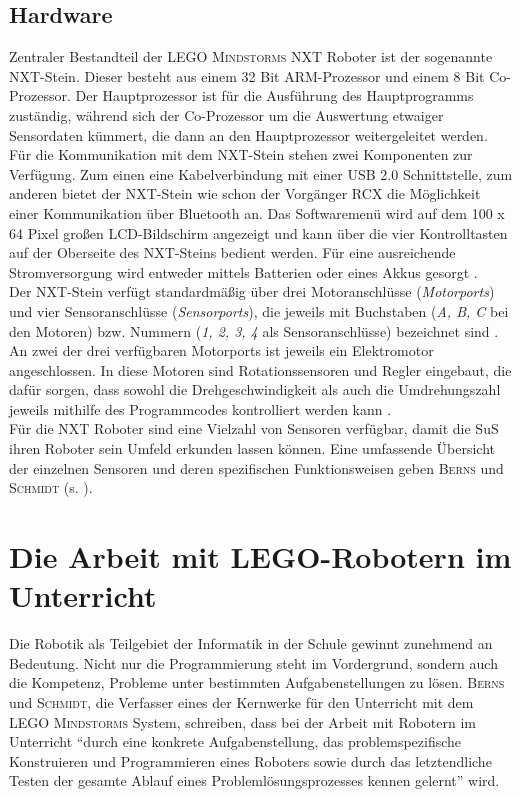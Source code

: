 \documentclass[paper=a4, pagesize, DIV=calc, BCOR=15mm, twoside=on, onecolumn=on, open = right, titlepage =on, parskip =half-, headsepline = on, footsepline = on, chapterprefix = on, appendixprefix = off, fontsize = 12pt, numbers = noenddot, abstract = on]{scrbook}
\numberwithin{equation}{chapter}
\theoremstyle{definition}
\theoremstyle{plain}
\theoremstyle{plain}
\theoremstyle{remark}
\theoremstyle{plain}
\theoremstyle{plain}
\begin{document}
\par \singlespacing
\subsection{Hardware}
\onehalfspacing
Zentraler Bestandteil der \textsc{LEGO Mindstorms} NXT Roboter ist der sogenannte NXT-Stein. Dieser besteht aus einem 32 Bit ARM-Prozessor und einem 8 Bit Co-Prozessor. Der Hauptprozessor ist für die Ausführung des Hauptprogramms zuständig, während sich der Co-Prozessor um die Auswertung etwaiger Sensordaten kümmert, die dann an den Hauptprozessor weitergeleitet werden. Für die Kommunikation mit dem NXT-Stein stehen zwei Komponenten zur Verfügung. Zum einen eine Kabelverbindung mit einer USB 2.0 Schnittstelle, zum anderen bietet der NXT-Stein wie schon der Vorgänger RCX die Möglichkeit einer Kommunikation über Bluetooth an. Das Softwaremenü wird auf dem 100 x 64 Pixel großen LCD-Bildschirm angezeigt und kann über die vier Kontrolltasten auf der Oberseite des NXT-Steins bedient werden. Für eine ausreichende Stromversorgung wird entweder mittels Batterien oder eines Akkus gesorgt \cite[S.42]{berns:10}.\\
Der NXT-Stein verfügt standardmäßig über drei Motoranschlüsse (\emph{Motorports}) und vier Sensoranschlüsse (\emph{Sensorports}), die jeweils mit Buchstaben (\emph{A, B, C} bei den Motoren) bzw. Nummern (\emph{1, 2, 3, 4} als Sensoranschlüsse) bezeichnet sind \cite[S.43]{berns:10}. An zwei der drei verfügbaren Motorports ist jeweils ein Elektromotor angeschlossen. In diese Motoren sind Rotationssensoren und Regler eingebaut, die dafür sorgen, dass sowohl die Drehgeschwindigkeit als auch die Umdrehungszahl jeweils mithilfe des Programmcodes kontrolliert werden kann \cite[S.45--47]{berns:10}.\\
Für die NXT Roboter sind eine Vielzahl von Sensoren verfügbar, damit die SuS ihren Roboter sein Umfeld erkunden lassen können. Eine umfassende Übersicht der einzelnen Sensoren und deren spezifischen Funktionsweisen geben \textsc{Berns} und \textsc{Schmidt} (s. \cite[Kapitel 4.2]{berns:10}). 

\par \singlespacing
 \section{Die Arbeit mit LEGO-Robotern im Unterricht}
\onehalfspacing
Die Robotik als Teilgebiet der Informatik in der Schule gewinnt zunehmend an Bedeutung. Nicht nur die Programmierung steht im Vordergrund, sondern auch die Kompetenz, Probleme unter bestimmten Aufgabenstellungen zu lösen. \textsc{Berns} und \textsc{Schmidt}, die Verfasser eines der Kernwerke für den Unterricht mit dem \textsc{LEGO Mindstorms} System, schreiben, dass bei der Arbeit mit Robotern im Unterricht "`durch eine konkrete Aufgabenstellung, das problemspezifische Konstruieren und Programmieren eines Roboters sowie durch das letztendliche Testen der gesamte Ablauf eines Problemlösungsprozesses kennen gelernt"' \cite[S.2]{berns:10} wird.
\end{document}
